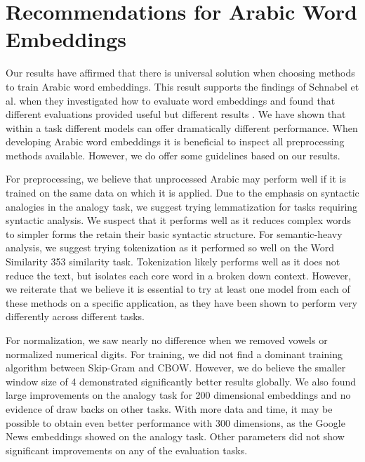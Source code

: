 \section{Recommendations for Arabic Word Embeddings}
\label{sec:recommendations}

Our results have affirmed that there is universal solution when choosing methods to train Arabic word embeddings. This result supports the findings of Schnabel et al. when they investigated how to evaluate word embeddings and found that different evaluations provided useful but different results \cite{schnabel2015evaluation}. We have shown that within a task different models can offer dramatically different performance. When developing Arabic word embeddings it is beneficial to inspect all preprocessing methods available. However, we do offer some guidelines based on our results.

For preprocessing, we believe that unprocessed Arabic may perform well if it is trained on the same data on which it is applied. Due to the emphasis on syntactic analogies in the analogy task, we suggest trying lemmatization for tasks requiring syntactic analysis. We suspect that it performs well as it reduces complex words to simpler forms the retain their basic syntactic structure. For semantic-heavy analysis, we suggest trying tokenization as it performed so well on the Word Similarity 353 similarity task. Tokenization likely performs well as it does not reduce the text, but isolates each core word in a broken down context. However, we reiterate that we believe it is essential to try at least one model from each of these methods on a specific application, as they have been shown to perform very differently across different tasks.

For normalization, we saw nearly no difference when we removed vowels or normalized numerical digits. For training, we did not find a dominant training algorithm between Skip-Gram and CBOW. However, we do believe the smaller window size of 4 demonstrated significantly better results globally. We also found large improvements on the analogy task for 200 dimensional embeddings and no evidence of draw backs on other tasks. With more data and time, it may be possible to obtain even better performance with 300 dimensions, as the Google News embeddings showed on the analogy task. Other parameters did not show significant improvements on any of the evaluation tasks.